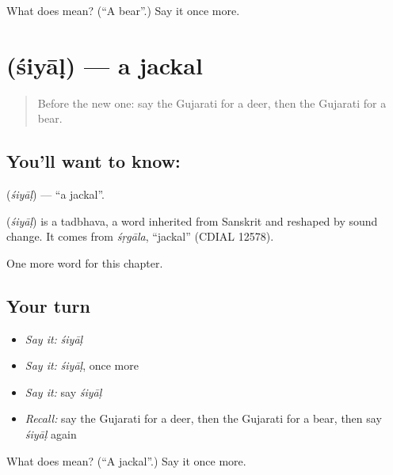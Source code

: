 \begin{tcolorbox}[breakable,colback=teal!4,colframe=teal!35!black,title={Before you move on}]
What does  mean? (\textquotedblleft{}A bear\textquotedblright{}.) Say it once more.
\end{tcolorbox}
\section[\texorpdfstring{\gu{શિયાળ} (śiyāḷ)}{શિયાળ (śiyāḷ)}]{ (śiyāḷ) — a jackal}

\label{lesson:GU-C122-siyal}



\begin{quote}
Before the new one: say the Gujarati for a deer, then the Gujarati for a bear.
\end{quote}

\subsection*{You'll want to know: }
\textbf{} (\emph{śiyāḷ}) — \textquotedblleft{}a jackal\textquotedblright{}.

\begin{cousinweb}
\textbf{} (\emph{śiyāḷ}) is a tadbhava, a word inherited from Sanskrit and reshaped by sound change. It comes from \emph{śṛgāla}, \textquotedblleft{}jackal\textquotedblright{} (CDIAL 12578).
\end{cousinweb}

\begin{grammarlens}[title={What you've built}]
One more word for this chapter.
\end{grammarlens}

\subsection*{Your turn}
\begin{itemize}
\raggedright
  \item \emph{Say it:} \emph{śiyāḷ}
  \item \emph{Say it:} \emph{śiyāḷ}, once more
  \item \emph{Say it:} say \emph{śiyāḷ}
  \item \emph{Recall:} say the Gujarati for a deer, then the Gujarati for a bear, then say \emph{śiyāḷ} again
\end{itemize}

\begin{tcolorbox}[breakable,colback=teal!4,colframe=teal!35!black,title={Before you move on}]
What does  mean? (\textquotedblleft{}A jackal\textquotedblright{}.) Say it once more.
\end{tcolorbox}
